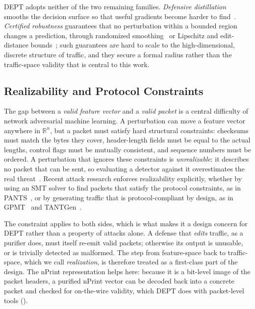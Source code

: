 DEPT adopts neither of the two remaining families. \emph{Defensive distillation} smooths
the decision surface so that useful gradients become harder to
find~\cite{papernot2016distillation}. \emph{Certified robustness} guarantees that no perturbation within a
bounded region changes a prediction, through randomized
smoothing~\cite{cohen2019certified,yan2025certta} or Lipschitz and edit-distance
bounds~\cite{abad2025lipslev}; such guarantees are hard to scale to the high-dimensional,
discrete structure of traffic, and they secure a formal radius rather than the
traffic-space validity that is central to this work.

\subsection{Realizability and Protocol Constraints}\label{subsec:bg-realizability}
The gap between a \emph{valid feature vector} and a \emph{valid packet} is a central
difficulty of network adversarial machine learning. A perturbation can move a feature
vector anywhere in $\mathbb{R}^{n}$, but a packet must satisfy hard structural constraints:
checksums must match the bytes they cover, header-length fields must be equal to the actual
lengths, control flags must be mutually consistent, and sequence numbers must be ordered. A
perturbation that ignores these constraints is \emph{unrealizable}: it describes no packet
that can be sent, so evaluating a detector against it overestimates the real
threat~\cite{pierazzi2020intriguing,hashemi2019towards}. Recent attack research enforces
realizability explicitly, whether by using an SMT solver to find packets that satisfy
the protocol constraints, as in PANTS~\cite{jin2025robustifying}, or by generating
traffic that is protocol-compliant by design, as in GPMT~\cite{sun2023gpmt} and
TANTGen~\cite{pissarra2026tantgen}.

The constraint applies to both sides, which is what makes it a design concern for DEPT
rather than a property of attacks alone. A defense that \emph{edits} traffic, as a purifier
does, must itself re-emit valid packets; otherwise its output is unusable, or is trivially
detected as malformed. The step from feature-space back to traffic-space, which we call
\emph{realization}, is therefore treated as a first-class part of the design. The nPrint
representation helps here: because it is a bit-level image of the packet headers, a
purified nPrint vector can be decoded back into a concrete packet and checked for
on-the-wire validity, which DEPT does with packet-level tools ().

